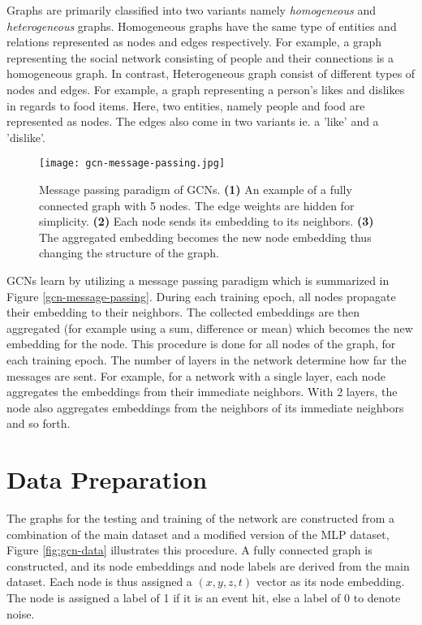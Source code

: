 Graphs are primarily classified into two variants namely
\emph{homogeneous} and \emph{heterogeneous} graphs. Homogeneous graphs
have the same type of entities and relations represented as nodes and
edges respectively. For example, a graph representing the social
network consisting of people and their connections is a homogeneous
graph. In contrast, Heterogeneous graph consist of different types of
nodes and edges. For example, a graph representing a person's likes
and dislikes in regards to food items. Here, two entities, namely
people and food are represented as nodes. The edges also come in two
variants ie. a 'like' and a 'dislike'.

\begin{figure}[htb]
  \centering
  \texttt{[image: gcn-message-passing.jpg]}
  \caption{Message passing paradigm of GCNs. \textbf{(1)} An example
  of a fully connected graph with 5 nodes. The edge weights are hidden
  for simplicity. \textbf{(2)} Each node sends its embedding to its
  neighbors. \textbf{(3)} The aggregated embedding becomes the new
  node embedding thus changing the structure of the graph.}
  \label{fig:gcn-message-passing}
\end{figure}

GCNs learn by utilizing a message passing paradigm which is summarized
in Figure \ref{gcn-message-passing}. During each training epoch, all
nodes propagate their embedding to their neighbors. The collected
embeddings are then aggregated (for example using a sum, difference or
mean) which becomes the new embedding for the node. This procedure is
done for all nodes of the graph, for each training epoch. The number
of layers in the network determine how far the messages are sent. For
example, for a network with a single layer, each node aggregates the
embeddings from their immediate neighbors. With 2 layers, the node
also aggregates embeddings from the neighbors of its immediate
neighbors and so forth.

\section{Data Preparation}
\label{sec:gcn-data-prep}

The graphs for the testing and training of the network are constructed
from a combination of the main dataset and a modified version of the
MLP dataset, Figure \ref{fig:gcn-data} illustrates this procedure. A
fully connected graph is constructed, and its node embeddings and node
labels are derived from the main dataset. Each node is thus assigned a
$(x,y,z,t)$ vector as its node embedding. The node is assigned a label
of 1 if it is an event hit, else a label of 0 to denote noise.

